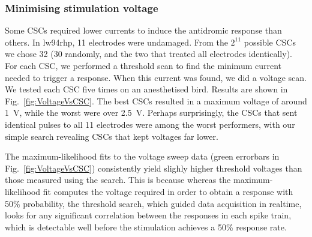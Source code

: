 \documentclass[10pt,letterpaper]{article}
\newcommand\fig[1]{Fig.~\ref{#1}}
\newcommand{\noprint}[1]{}
\begin{document}
\subsubsection{Minimising stimulation voltage}

Some CSCs required lower currents to induce the antidromic response
than others. In lw94rhp, 11 electrodes were undamaged. From the
$2^{11}$ possible CSCs we chose 32 (30 randomly, and the two that
treated all electrodes identically).  For each CSC, we performed a
threshold scan to find the minimum current needed to trigger a
response.  When this current was found, we did a voltage scan.  We
tested each CSC five times on an anesthetised bird.  Results are shown
in \fig{fig:VoltageVsCSC}.  The best CSCs resulted in a maximum
voltage of around 1~V, while the worst were over 2.5~V.  Perhaps
surprisingly, the CSCs that sent identical pulses to all 11 electrodes
were among the worst performers, with our simple search revealing CSCs
that kept voltages far lower.

The maximum-likelihood fits to the voltage sweep data (green errorbars
in \fig{fig:VoltageVsCSC}) consistently yield slighly higher threshold
voltages than those measured using the search.  This is because
whereas the maximum-likelihood fit computes the voltage required in
order to obtain a response with 50\% probability, the threshold
search, which guided data acquisition in realtime, looks for any
significant correlation between the responses in each spike train,
which is detectable well before the stimulation achieves a 50\%
response rate.

\noprint{FIXME: The following caveat doesn't apply to
  lw95rhp-2015-12-04: Each threshold scan terminated when a
  stimulation voltage over 3 V was detected, so for some datasets
  (e.g. lw95rhp-2015-12-09) we were unable to acquire all five
  measurements for some CSCs, and thus they are worse than the figure
  shows.}
\end{document}
